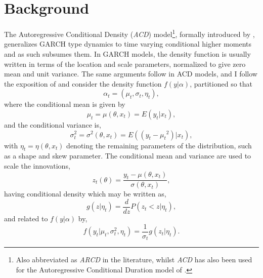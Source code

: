 \section{Background}\label{sec:background}
The Autoregressive Conditional Density (\emph{ACD}) model\footnote{Also abbreviated as \emph{ARCD} in the literature, whilst \emph{ACD} has also been used for the Autoregressive Conditional
Duration model of \citet{Engle1998}.}, formally introduced by \citet{Hansen1994}, generalizes GARCH type dynamics to time varying conditional higher moments and as such subsumes them. In GARCH models, the density function is usually written in terms of the location and scale parameters, normalized to give zero mean and unit variance. The same arguments follow in ACD models, and I follow the exposition of \citet{Hansen1994} and consider the density function $f(y|\alpha)$, partitioned so that
\begin{equation}\label{eq:garchdensity1}
{\alpha _t} = \left( {{\mu _t},{\sigma _t},{\eta _t}} \right),
\end{equation}
where the conditional mean is given by
\begin{equation}\label{eq:garchdensity2}
{\mu _t} = \mu \left( {\theta ,{x_t}} \right) = E\left( {{y_t}|{x_t}} \right),
\end{equation}
and the conditional variance is,
\begin{equation}\label{eq:garchdensity3}
\sigma _t^2 = {\sigma ^2}\left( {\theta ,{x_t}} \right) = E\left( {\left( {{y_t} - {\mu _t}^2} \right)\left| {{x_t}} \right.} \right),
\end{equation}
with ${\eta_t} = \eta(\theta ,{x_t})$ denoting the remaining parameters of the distribution, such as a shape and skew parameter. The conditional mean and variance are used to scale the innovations,
\begin{equation}\label{eq:garchdensity4}
{z_t}\left( \theta  \right) = \frac{{{y_t} - \mu \left( {\theta ,{x_t}} \right)}}{{\sigma \left( {\theta ,{x_t}} \right)}},
\end{equation}
having conditional density which may be written as,
\begin{equation}\label{eq:garchdensity5}
g\left( {z|{\eta_t}} \right) = \frac{d}{{dz}}P\left( {{z_t} < z|{\eta_t}} \right),
\end{equation}
and related to $f(y|\alpha)$ by,
\begin{equation}\label{eq:garchdensity6}
f\left( {{y_t}|{\mu _t},\sigma _t^2,{\eta_t}} \right) = \frac{1}{{{\sigma _t}}}g\left( {{z_t}|{\eta_t}} \right).
\end{equation}
